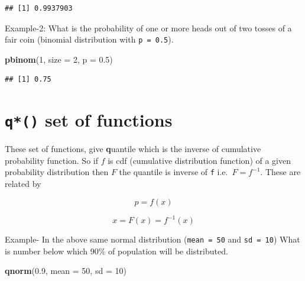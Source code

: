 \documentclass[
]{book}
\newenvironment{Shaded}{\begin{snugshade}}{\end{snugshade}}
\newcommand{\AttributeTok}[1]{\textcolor[rgb]{0.13,0.29,0.53}{#1}}
\newcommand{\DecValTok}[1]{\textcolor[rgb]{0.00,0.00,0.81}{#1}}
\newcommand{\FloatTok}[1]{\textcolor[rgb]{0.00,0.00,0.81}{#1}}
\newcommand{\FunctionTok}[1]{\textcolor[rgb]{0.13,0.29,0.53}{\textbf{#1}}}
\newcommand{\NormalTok}[1]{#1}
\begin{document}
\begin{verbatim}
## [1] 0.9937903
\end{verbatim}

Example-2: What is the probability of one or more heads out of two tosses of a fair coin (binomial distribution with \texttt{p\ =\ 0.5}).

\begin{Shaded}
\begin{Highlighting}[]
\FunctionTok{pbinom}\NormalTok{(}\DecValTok{1}\NormalTok{, }\AttributeTok{size =} \DecValTok{2}\NormalTok{, }\AttributeTok{p =} \FloatTok{0.5}\NormalTok{)}
\end{Highlighting}
\end{Shaded}

\begin{verbatim}
## [1] 0.75
\end{verbatim}

\hypertarget{q-set-of-functions}{%
\section{\texorpdfstring{\texttt{q*()} set of functions}{q*() set of functions}}\label{q-set-of-functions}}

These set of functions, give \textbf{q}uantile which is the inverse of cumulative probability function. So if \(f\) is cdf (cumulative distribution function) of a given probability distribution then \(F\) the quantile is inverse of \texttt{f} i.e.~\(F = f^{-1}\). These are related by

\begin{equation} 
p = f(x)
\label{eq:s1}
\end{equation}

\begin{equation} 
x = F(x) = f^{-1}(x)
\label{eq:s2}
\end{equation}

Example- In the above same normal distribution (\texttt{mean\ =\ 50} and \texttt{sd\ =\ 10}) What is number below which 90\% of population will be distributed.

\begin{Shaded}
\begin{Highlighting}[]
\FunctionTok{qnorm}\NormalTok{(}\FloatTok{0.9}\NormalTok{, }\AttributeTok{mean =} \DecValTok{50}\NormalTok{, }\AttributeTok{sd =} \DecValTok{10}\NormalTok{)}
\end{Highlighting}
\end{Shaded}
\end{document}
